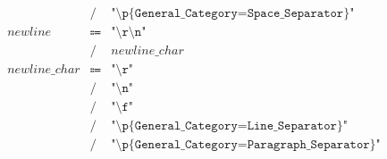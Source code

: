 \begin{align*}
\begin{array}{rcll}
        &\mathrel{/} &\texttt{"\textbackslash p\{General\_Category=Space\_Separator\}"} \\
        \mathit{newline}
        &\Coloneq &\texttt{"\textbackslash r\textbackslash n"} \\
        &\mathrel{/} &\mathit{newline\_char} \\
        \mathit{newline\_char}
        &\Coloneq &\texttt{"\textbackslash r"} \\
        &\mathrel{/} &\texttt{"\textbackslash n"} \\
        &\mathrel{/} &\texttt{"\textbackslash f"} \\
        &\mathrel{/} &\texttt{"\textbackslash p\{General\_Category=Line\_Separator\}"} \\
        &\mathrel{/} &\texttt{"\textbackslash p\{General\_Category=Paragraph\_Separator\}"}
    \end{array}
\end{align*}

